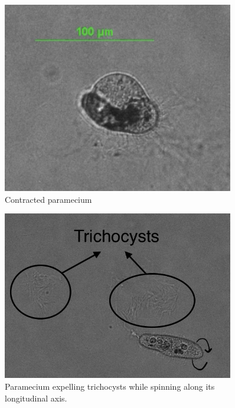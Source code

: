 \noindent
\begin{minipage}{0.49\textwidth}
\begin{figure}[H]
\centering 
\captionsetup{width=0.9\linewidth, justification=centering}
\includegraphics[width=0.9\textwidth]{Figures/Contracted_cell.png}
\caption{Contracted paramecium}
\label{fig:Contracted_cell}
\end{figure}
\end{minipage}
\hfill
\begin{minipage}{0.49\textwidth}
\begin{figure}[H]
\centering 
\captionsetup{width=0.9\linewidth, justification=centering}
\includegraphics[width=0.9\textwidth]{Figures/Trichocysts_expulsion.png}
\caption{Paramecium expelling trichocysts while spinning along its longitudinal axis.}
\label{fig:Trichocysts_expulsion}
\end{figure}
\end{minipage}

